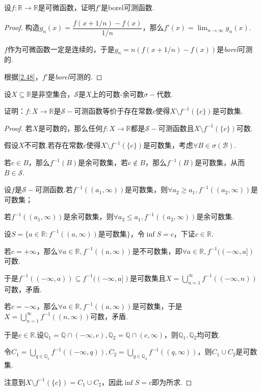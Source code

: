 \begin{problem}[18]\label{2.B.18}
    设\(f: \mathbb{R} \to \mathbb{R}\)是可微函数，证明\(f'\)是borel可测函数.
\end{problem}

\begin{proof}
    构造\(g_n(x)=\dfrac{f(x+1/n)-f(x)}{1/n}\)，那么\(f'(x)=\lim_{n \to \infty}g_n(x)\).

    \(f\)作为可微函数一定是连续的，于是\(g_n=n(f(x+1/n)-f(x))\)是\textit{borel}可测的.

    根据\cref{2.48}，\(f'\)是\textit{borel}可测的.
\end{proof}

\newpage

\begin{problem}[19]\label{2.B.19}
    设\(X \subseteq \mathbb{R}\)是非空集合，\(\mathcal{S}\)是\(X\)上的可数-余可数\(\sigma-\)代数.

    证明：\(f: X \to \mathbb{R}\)是\(\mathcal{S}-\)可测函数等价于存在常数\(c\)使得\(X \setminus f^{-1}(\{c\})\)是可数集.
\end{problem}

\begin{proof}
    若\(X\)是可数的，那么任何\(f: X \to \mathbb{R}\)都是\(\mathcal{S}-\)可测函数且\(X \setminus f^{-1}(\{c\})\)可数.

    假设\(X\)不可数.若存在常数\(c\)使得\(X \setminus f^{-1}(\{c\})\)是可数集，考虑\(\forall B \in \sigma(\mathcal{B})\).

    若\(c \in B\)，那么\(f^{-1}(B)\)是余可数集，若\(c \notin B\)，那么\(f^{-1}(B)\)是可数集，从而\(B \in \mathcal{S}\).

    设\(f\)是\(\mathcal{S}-\)可测函数.若\(f^{-1}((a_1, \infty))\)是可数集，则\(\forall a_2 \geq a_1, f^{-1}((a_2, \infty))\)是可数集；

    若\(f^{-1}((a_1, \infty))\)是余可数集，则\(\forall a_2 \leq a_1, f^{-1}((a_2, \infty))\)是余可数集.

    设\(S=\{a \in \mathbb{R}: f^{-1}((a, \infty)) \text{是可数集}\}\)，令\(\inf S=c\)，下证\(c \in \mathbb{R}\).

    若\(c=+\infty\)，那么\(\forall a \in \mathbb{R}, f^{-1}((a, \infty))\)是不可数集，即\(\forall a \in \mathbb{R}, f^{-1}((-\infty, a])\)可数.

    于是\(f^{-1}((-\infty, a)) \subseteq f^{-1}((-\infty, a])\)是可数集且\(X=\bigcup_{n=1}^\infty f^{-1}((-\infty, n))\)可数，矛盾.

    若\(c=-\infty\)，那么\(\forall a \in \mathbb{R}, f^{-1}((a, \infty))\)是可数集，于是\(X=\bigcup_{n=1}^\infty f^{-1}((n, \infty))\)可数，矛盾.

    于是\(c \in \mathbb{R}\).设\(\mathbb{Q}_1=\mathbb{Q} \cap (-\infty, c), \mathbb{Q}_2=\mathbb{Q} \cap (c, \infty)\)，则\(\mathbb{Q}_1, \mathbb{Q}_2\)均可数.
    
    令\(C_1=\bigcup_{q \in \mathbb{Q}_1} f^{-1}((-\infty, q)), C_2=\bigcup_{q \in \mathbb{Q}_2} f^{-1}((q, \infty))\)，则\(C_1 \cup C_2\)是可数集.
   
    注意到\(X \setminus f^{-1}(\{c\})=C_1 \cup C_2\)，因此\(\inf S=c\)即为所求.
\end{proof}

